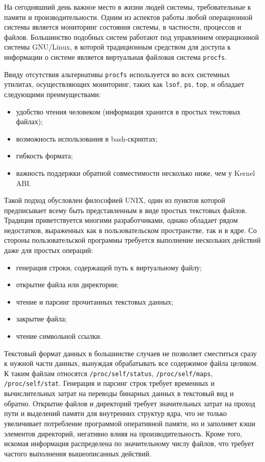 \label{sec:intro}
На сегодняшний день важное место в жизни людей системы, требовательные к памяти и
производительности. Одним из аспектов работы любой операционной системы является
мониторинг состояния системы, в частности, процессов и файлов. Большинство
подобных систем работают под управлением операционной системы GNU/Linux, в
которой традиционным средством для доступа к информации о системе является
виртуальная файловая система \texttt{procfs}.

Ввиду отсутствия альтернативы \texttt{procfs} используется во всех системных
утилитах, осуществляющих мониторинг, таких как \texttt{lsof}, \texttt{ps},
\texttt{top}, и обладает следующими преимуществами:

\begin{itemize}
\item удобство чтения человеком (информация хранится в простых текстовых файлах);
\item возможность использования в bash-скриптах;
\item гибкость формата;
\item важность поддержки обратной совместимости несколько ниже, чем у Kernel ABI.
\end{itemize}

Такой подход обусловлен философией UNIX, один из пунктов которой предписывает
всему быть представленным в виде простых текстовых файлов. Традиция приветствуется
многими  разработчиками,
однако обладает рядом недостатков, выраженных как в пользовательском
пространстве, так и в ядре. Со стороны пользовательской программы требуется
выполнение нескольких действий даже для простых операций:

\begin{itemize}
\item генерация строки, содержащей путь к виртуальному файлу;
\item открытие файла или директории;
\item чтение и парсинг прочитанных текстовых данных;
\item закрытие файла;
\item чтение символьной ссылки.
\end{itemize}

Текстовый формат данных в большинстве случаев не позволяет сместиться сразу к
нужной части данных, вынуждая обрабатывать все содержимое файла целиком.
К таким файлам относятся \texttt{/proc/self/status},
\texttt{/proc/self/maps}, \texttt{/proc/self/stat}.
Генерация и парсинг строк требует временных и вычислительных затрат на переводы
бинарных данных в текстовый вид и обратно. Открытие файлов и директорий требует
значительных затрат на проход пути и выделений памяти для внутренних структур
ядра, что не только увеличивает потребление программой оперативной памяти, но и
заполняет кэши элементов директорий, негативно влияя на производительность.
Кроме того, искомая информация распределена по значительному числу файлов, что
требует частого выполнения вышеописанных действий.

